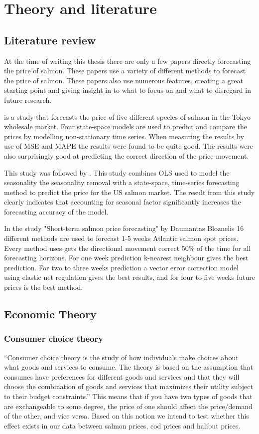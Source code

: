 \section{Theory and literature}

\subsection{Literature review}
At the time of writing this thesis there are only a few papers directly forecasting the price of salmon. These papers use a variety of different methods to forecast the price of salmon. These papers also use numerous features, creating a great starting point and giving insight in to what to focus on and what to disregard in future research. 

\textcite{vukina_1994} is a study that forecasts the price of five different species of salmon in the Tokyo wholesale market. Four state-space models are used to predict and compare the prices by modelling non-stationary time series. When measuring the results by use of MSE and MAPE the results were found to be quite good. The results were also surprisingly good at predicting the correct direction of the price-movement.

This study was followed by \textcite{gu_anderson_1995}. This study combines OLS used to model the seasonality the seasonality removal with a state-space, time-series forecasting method to predict the price for the US salmon market. The result from this study clearly indicates that accounting for seasonal factor significantly increases the forecasting accuracy of the model.

In the study "Short-term salmon price forecasting" by Daumantas Bloznelis 16 different methods are used to forecast 1-5 weeks Atlantic salmon spot prices. Every method \textcite{bloznelis_2017} uses gets the directional movement correct 50\% of the time for all forecasting horizons. For one week prediction k-nearest neighbour gives the best prediction. For two to three weeks prediction a vector error correction model using elastic net regulation gives the best results, and for four to five weeks future prices is the best method.

\subsection{Economic Theory}
\subsubsection{Consumer choice theory}
``Consumer choice theory is the study of how individuals make choices about what goods and services to consume. The theory is based on the assumption that consumes have preferences for different goods and services and that they will choose the combination of goods and services that maximizes their utility subject to their budget constraints.'' \parencite{Perloff_2017} This means that if you have two types of goods that are exchangeable to some degree, the price of one should affect the price/demand of the other, and vice versa. Based on this notion we intend to test whether this effect exists in our data between salmon prices, cod prices and halibut prices.

